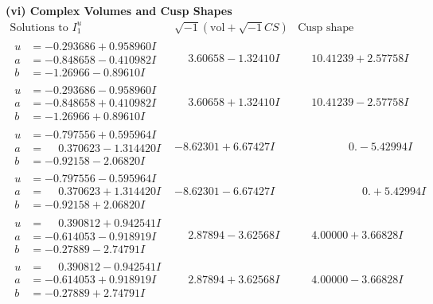 \documentclass[1p]{elsarticle_modified}
\theoremstyle{definition}
\newcommand{\I}{\sqrt{-1}}
\begin{document}
\newpage\flushleft \textbf{(vi) Complex Volumes and Cusp Shapes}
$$\begin{array}{c|c|c}  
\text{Solutions to }I^u_{1}& \I (\text{vol} + \sqrt{-1}CS) & \text{Cusp shape}\\
 \hline 
\begin{aligned}
u &= -0.293686 + 0.958960 I \\
a &= -0.848658 - 0.410982 I \\
b &= -1.26966 - 0.89610 I\end{aligned}
 & \phantom{-}3.60658 - 1.32410 I & \phantom{-}10.41239 + 2.57758 I \\ \hline\begin{aligned}
u &= -0.293686 - 0.958960 I \\
a &= -0.848658 + 0.410982 I \\
b &= -1.26966 + 0.89610 I\end{aligned}
 & \phantom{-}3.60658 + 1.32410 I & \phantom{-}10.41239 - 2.57758 I \\ \hline\begin{aligned}
u &= -0.797556 + 0.595964 I \\
a &= \phantom{-}0.370623 - 1.314420 I \\
b &= -0.92158 - 2.06820 I\end{aligned}
 & -8.62301 + 6.67427 I & \phantom{-0.000000 } 0. - 5.42994 I \\ \hline\begin{aligned}
u &= -0.797556 - 0.595964 I \\
a &= \phantom{-}0.370623 + 1.314420 I \\
b &= -0.92158 + 2.06820 I\end{aligned}
 & -8.62301 - 6.67427 I & \phantom{-0.000000 -}0. + 5.42994 I \\ \hline\begin{aligned}
u &= \phantom{-}0.390812 + 0.942541 I \\
a &= -0.614053 - 0.918919 I \\
b &= -0.27889 - 2.74791 I\end{aligned}
 & \phantom{-}2.87894 - 3.62568 I & \phantom{-}4.00000 + 3.66828 I \\ \hline\begin{aligned}
u &= \phantom{-}0.390812 - 0.942541 I \\
a &= -0.614053 + 0.918919 I \\
b &= -0.27889 + 2.74791 I\end{aligned}
 & \phantom{-}2.87894 + 3.62568 I & \phantom{-}4.00000 - 3.66828 I \\ \hline\begin{aligned}

\end{aligned}
\end{array}$$
\end{document}
